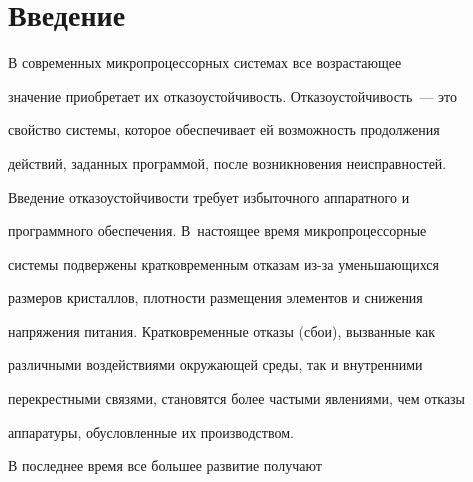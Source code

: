 















      \thispagestyle{headings}





      


            \label{st\stat}





\section{Введение}





      В современных микропроцессорных сис\-темах все возрастающее 


значение приобретает их отказоустойчивость. Отказоустойчивость~--- это 


свойство сис\-те\-мы, которое обеспечивает ей возможность продолжения 


действий, заданных программой, после возникновения неисправностей. 


Введение от\-ка\-зо\-устой\-чи\-вости требует избыточного аппаратного и 


программного обеспечения. В~настоящее время микропроцессорные 


сис\-темы  подвержены кратковременным отказам из-за уменьшающихся 


размеров кристаллов, плотности размещения элементов и снижения 


напряжения питания.  Кратковременные отказы (сбои), вызванные как 


различными воздействиями окружающей среды, так и внутренними 


перекрестными связями, становятся более частыми явлениями, чем отказы 


аппаратуры, обусловленные их производством.


      


      В последнее время все большее развитие получают 


